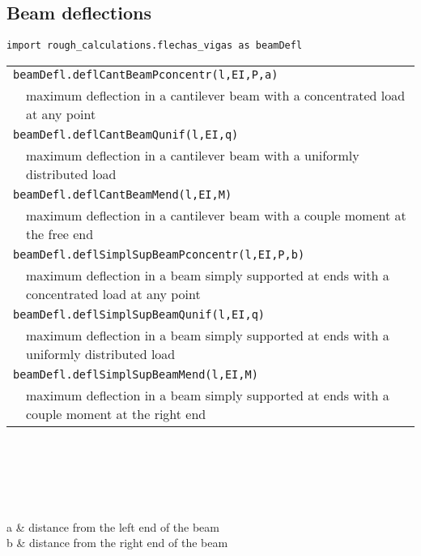 \subsection{Beam deflections}
\begin{verbatim}
import rough_calculations.flechas_vigas as beamDefl
\end{verbatim}
\begin{center}
\begin{tabular}{p{3cm}p{9.5cm}}
\multicolumn{2}{l}{{\tt beamDefl.deflCantBeamPconcentr(l,EI,P,a)}} \\
& maximum deflection in a cantilever beam with a concentrated load at any point \\
\multicolumn{2}{l}{{\tt beamDefl.deflCantBeamQunif(l,EI,q)}} \\
& maximum deflection in a cantilever beam with a uniformly distributed load\\
\multicolumn{2}{l}{{\tt beamDefl.deflCantBeamMend(l,EI,M)}} \\
& maximum deflection in a cantilever beam with a couple moment at the free end\\
\multicolumn{2}{l}{{\tt beamDefl.deflSimplSupBeamPconcentr(l,EI,P,b)}} \\
& maximum deflection in a  beam simply supported at ends with a concentrated load at any point\\
\multicolumn{2}{l}{{\tt beamDefl.deflSimplSupBeamQunif(l,EI,q)}} \\
& maximum deflection in a beam simply supported at ends with a uniformly distributed load\\
\multicolumn{2}{l}{{\tt beamDefl.deflSimplSupBeamMend(l,EI,M)}} \\
& maximum deflection in a beam simply supported at ends with a couple moment at the right end\\
\end{tabular}
\end{center}

\begin{paramFuncTable}
\lSpan{} \\
\EI{} \\
\Pload{} \\
\qload{} \\
\Mcoup{} \\
a & distance from the left end of the beam \\
b & distance from the right end of the beam \\
\end{paramFuncTable}

\clearpage

